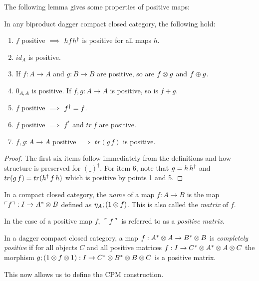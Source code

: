 The following lemma gives some properties of positive maps:

\begin{lemma}\label{lemma:positivemaps}
  In any biproduct dagger compact closed category, the following hold:
  \begin{enumerate}
    \item{} $f$ positive $\implies$ $h f {h}^{\dagger}$ is positive for all maps $h$.
    \item{} $id_{A}$ is positive.
    \item If $f:A\to A$ and $g:B\to B$ are positive, so are $f\otimes g$ and $f\oplus g$.
    \item $0_{A,A}$ is positive. If $f,g:A\to A$ is positive, so is $f+g$.
    \item $f$ positive $\implies$ ${f}^{\dagger}=f$.
    \item $f$ positive $\implies$ $f^{*}$ and $tr\ f$ are positive.
    \item $f,g:A\to A$ positive $\implies$ $tr (g\,f)$ is positive.
  \end{enumerate}
\end{lemma}
\begin{proof}
  The first six items follow immediately from the definitions and how structure is preserved for
  $(\_)^{\dagger}$. For item 6, note that $g = h\, {h}^{\dagger}$ and $tr(g\,f) = tr({h}^{\dagger}\,f\,h)$
  which is positive by points 1 and 5.%
\end{proof}

\begin{definition}\label{def:name}
  In a compact closed category, the \emph{name} of a map $f:A\to B$ is the map $\ulcorner f
  \urcorner:I \to A^{*} \otimes B$ defined as $\eta_{A}; (1\otimes f)$. This is also called the \emph{matrix} of
  $f$.
\end{definition}

In the case of a positive map $f$, $\ulcorner f \urcorner$ is referred to as a \emph{positive
matrix}.

\begin{definition}\label{def:completelypositive}
  In a dagger compact closed category, a map $f:A^{*}\otimes A \to B^{*}\otimes B$ is \emph{completely positive}
  if for all objects $C$ and all positive matrices $f: I \to C^{*} \otimes A^{*} \otimes A \otimes C$ the morphism
  $g ; (1\otimes f\otimes1):I \to C^{*} \otimes B^{*}\otimes B \otimes C$ is a positive matrix.
\end{definition}

This now allows us to define the CPM construction.

